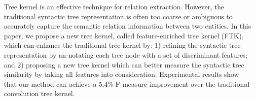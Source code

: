 Tree kernel is an effective technique for relation extraction. However, the traditional syntactic tree representation is often too coarse or ambiguous to accurately capture the semantic relation information between two entities. In this paper, we propose a new tree kernel, called feature-enriched tree kernel (FTK), which can enhance the traditional tree kernel by: 1) refining the syntactic tree representation by an-notating each tree node with a set of discriminant features; and 2) proposing a new tree kernel which can better measure the syntactic tree similarity by taking all features into consideration. Experimental results show that our method can achieve a 5.4\% F-measure improvement over the traditional convolution tree kernel.
